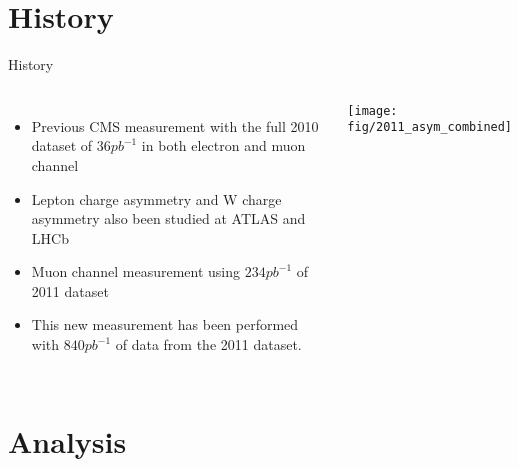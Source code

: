 \documentclass[t, 8pt]{beamer}
\begin{document}
\section{History}

\begin{frame}{History}
  \begin{columns}[c]
  \begin{itemize}
    \item Previous CMS measurement with the full 2010 dataset of $36 pb^{-1}$ in both electron and muon channel
    \item Lepton charge asymmetry and W charge asymmetry also been studied at ATLAS and LHCb
    \item Muon channel measurement using $234pb^{-1}$ of 2011 dataset
    \vspace{1cm}
    \item This new measurement has been performed with $840pb^{-1}$ of data from the 2011 dataset.
  \end{itemize}
    \texttt{[image: fig/2011\_asym\_combined]}
  \end{columns}
\end{frame}






\section{Analysis}
\end{document}
